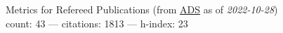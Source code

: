 Metrics for Refereed Publications (from \href{\adsurl}{ADS} as of \textit{2022-10-28}) \\count: 43 --- citations: 1813 --- h-index: 23
